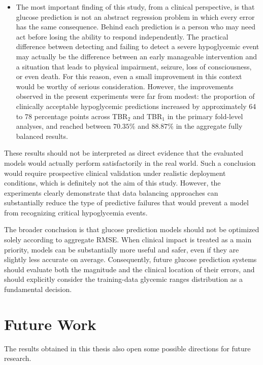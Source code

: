 \begin{itemize}
    \item The most important finding of this study, from a clinical perspective, is that glucose prediction is not an abstract regression problem in which every error has the same consequence. Behind each prediction is a person who may need act before losing the ability to respond independently. The practical difference between detecting and failing to detect a severe hypoglycemic event may actually be the difference between an early manageable intervention and a situation that leads to physical impairment, seizure, loss of consciousness, or even death. For this reason, even a small improvement in this context would be worthy of serious consideration. However, the improvements observed in the present experiments were far from modest: the proportion of clinically acceptable hypoglycemic predictions increased by approximately 64 to 78 percentage points across TBR$_2$ and TBR$_1$ in the primary fold-level analyses, and reached between \(70.35\%\) and \(88.87\%\) in the aggregate fully balanced results.

\end{itemize}

These results should not be interpreted as direct evidence that the evaluated models would actually perform satisfactorily in the real world. Such a conclusion would require prospective clinical validation under realistic deployment conditions, which is definitely not the aim of this study. However, the experiments clearly demonstrate that data balancing approaches can substantially reduce the type of predictive failures that would prevent a model from recognizing critical hypoglycemia events.

The broader conclusion is that glucose prediction models should not be optimized solely according to aggregate RMSE. When clinical impact is treated as a main priority, models can be substantially more useful and safer, even if they are slightly less accurate on average.  Consequently, future glucose prediction systems should evaluate both the magnitude and the clinical location of their errors, and should explicitly consider the training-data glycemic ranges distribution as a fundamental decision.

\section{Future Work}
\label{sec:future_work}

The results obtained in this thesis also open some possible directions for future research.

